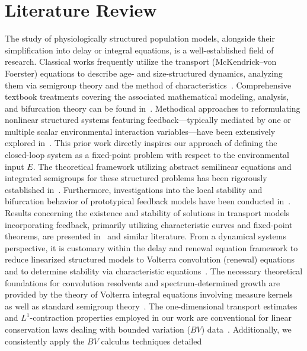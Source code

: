 \documentclass[pdflatex,sn-mathphys-num]{sn-jnl}
\theoremstyle{thmstyleone}
\theoremstyle{definition}
\theoremstyle{remark}
\numberwithin{equation}{section}
\begin{document}
\section{Literature Review}
The study of physiologically structured population models, alongside their simplification into delay or integral equations, is a well-established field of research. Classical works frequently utilize the transport (McKendrick--von Foerster) equations to describe age- and size-structured dynamics, analyzing them via semigroup theory and the method of characteristics~\cite{gurtin1974non,liang2025global,metz2014dynamics,wang2026damage,webb1985theory,yu2026microscopic,yu2026rigorous}. Comprehensive textbook treatments covering the associated mathematical modeling, analysis, and bifurcation theory can be found in~\cite{cushing1998introduction,iannelli1995mathematical,iannelli2017basic,metz2014dynamics,murray2007mathematical,perthame2007transport,liu2025bidirectional,de1997gentle,thieme2018mathematics}. Methodical approaches to reformulating nonlinear structured systems featuring feedback---typically mediated by one or multiple scalar environmental interaction variables---have been extensively explored in~\cite{akimenko2018two,barril2022formulation,barril2024hierarchical,diekmann2001formulation,diekmann2003steady,diekmann1998formulation,diekmann2020finite,diekmann2020models,liu2026computational}. This prior work directly inspires our approach of defining the closed-loop system as a fixed-point problem with respect to the environmental input $E$. The theoretical framework utilizing abstract semilinear equations and integrated semigroups for these structured problems has been rigorously established in~\cite{ducrot2021integrated,kang2022age,magal2018theory,wang2025analysis1}. Furthermore, investigations into the local stability and bifurcation behavior of prototypical feedback models have been conducted in~\cite{diekmann2010daphnia,scarabel2021numerical,wang2026algebraic}. Results concerning the existence and stability of solutions in transport models incorporating feedback, primarily utilizing characteristic curves and fixed-point theorems, are presented in~\cite{bartlomiejczyk2015existence,calsina1995model,yu2026pattern} and similar literature. From a dynamical systems perspective, it is customary within the delay and renewal equation framework to reduce linearized structured models to Volterra convolution (renewal) equations and to determine stability via characteristic equations~\cite{diekmann2012delay,hale2013introduction,wang2026breakdown}. The necessary theoretical foundations for convolution resolvents and spectrum-determined growth are provided by the theory of Volterra integral equations involving measure kernels~\cite{gripenberg1990volterra,yu2026beyond} as well as standard semigroup theory~\cite{engel2000one,wang2026elliptic}. The one-dimensional transport estimates and $L^1$-contraction properties employed in our work are conventional for linear conservation laws dealing with bounded variation ($BV$) data~\cite{bressan2000hyperbolic,bressan2023remark,diperna1989ordinary,wang2025multi}. Additionally, we consistently apply the $BV$ calculus techniques detailed 
\end{document}
